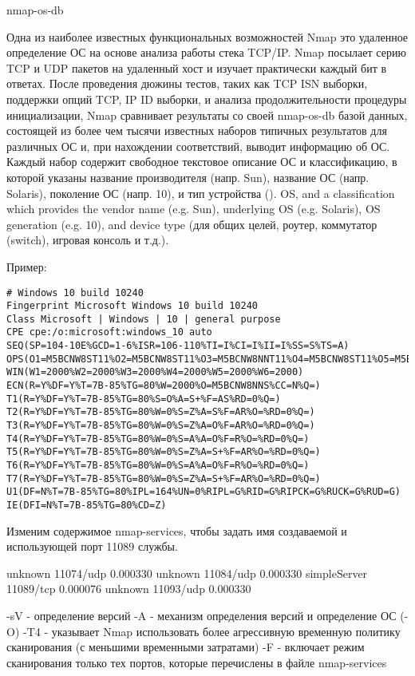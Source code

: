 \documentclass[12pt,a4paper]{report}
\begin{document}
nmap-os-db

Одна из наиболее известных функциональных возможностей Nmap это удаленное определение ОС на основе анализа работы стека TCP/IP. Nmap посылает серию TCP и UDP пакетов на удаленный хост и изучает практически каждый бит в ответах. После проведения дюжины тестов, таких как TCP ISN выборки, поддержки опций TCP, IP ID выборки, и анализа продолжительности процедуры инициализации, Nmap сравнивает результаты со своей nmap-os-db базой данных, состоящей из более чем тысячи известных наборов типичных результатов для различных ОС и, при нахождении соответствий, выводит информацию об ОС. Каждый набор содержит свободное текстовое описание ОС и классификацию, в которой указаны название производителя (напр. Sun), название ОС (напр. Solaris), поколение ОС (напр. 10), и тип устройства (). OS, and a classification which provides the vendor name (e.g. Sun), underlying OS (e.g. Solaris), OS generation (e.g. 10), and device type (для общих целей, роутер, коммутатор (switch), игровая консоль и т.д.).

Пример:
\begin{verbatim}
# Windows 10 build 10240
Fingerprint Microsoft Windows 10 build 10240
Class Microsoft | Windows | 10 | general purpose
CPE cpe:/o:microsoft:windows_10 auto
SEQ(SP=104-10E%GCD=1-6%ISR=106-110%TI=I%CI=I%II=I%SS=S%TS=A)
OPS(O1=M5BCNW8ST11%O2=M5BCNW8ST11%O3=M5BCNW8NNT11%O4=M5BCNW8ST11%O5=M5BCNW8ST11%O6=M5BCST11)
WIN(W1=2000%W2=2000%W3=2000%W4=2000%W5=2000%W6=2000)
ECN(R=Y%DF=Y%T=7B-85%TG=80%W=2000%O=M5BCNW8NNS%CC=N%Q=)
T1(R=Y%DF=Y%T=7B-85%TG=80%S=O%A=S+%F=AS%RD=0%Q=)
T2(R=Y%DF=Y%T=7B-85%TG=80%W=0%S=Z%A=S%F=AR%O=%RD=0%Q=)
T3(R=Y%DF=Y%T=7B-85%TG=80%W=0%S=Z%A=O%F=AR%O=%RD=0%Q=)
T4(R=Y%DF=Y%T=7B-85%TG=80%W=0%S=A%A=O%F=R%O=%RD=0%Q=)
T5(R=Y%DF=Y%T=7B-85%TG=80%W=0%S=Z%A=S+%F=AR%O=%RD=0%Q=)
T6(R=Y%DF=Y%T=7B-85%TG=80%W=0%S=A%A=O%F=R%O=%RD=0%Q=)
T7(R=Y%DF=Y%T=7B-85%TG=80%W=0%S=Z%A=S+%F=AR%O=%RD=0%Q=)
U1(DF=N%T=7B-85%TG=80%IPL=164%UN=0%RIPL=G%RID=G%RIPCK=G%RUCK=G%RUD=G)
IE(DFI=N%T=7B-85%TG=80%CD=Z)
\end{verbatim}



Изменим содержимое nmap-services, чтобы задать имя создаваемой и использующей порт 11089 службы.

unknown	11074/udp	0.000330
unknown	11084/udp	0.000330
simpleServer	11089/tcp	0.000076
unknown	11093/udp	0.000330



-sV - определение версий
-A - механизм определения версий и определение ОС (-O)
-T4 - указывает Nmap использовать более агрессивную временную политику сканирования (с меньшими временными затратами)
-F - включает режим сканирования только тех портов, которые перечислены в файле nmap-services
\end{document}
